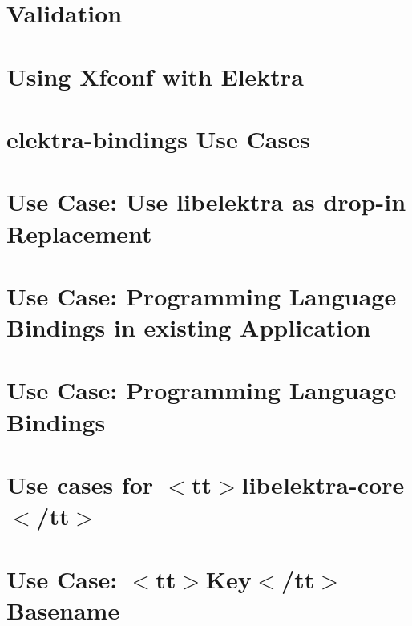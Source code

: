 \let\mypdfximage\pdfximage\def\pdfximage{\immediate\mypdfximage}\documentclass[twoside]{book}
\newcommand{\+}{\discretionary{\mbox{\scriptsize$\hookleftarrow$}}{}{}}
\begin{document}
\chapter{Validation}
\label{doc_tutorials_validation_md}

\chapter{Using Xfconf with Elektra}
\label{doc_tutorials_xfconf_md}

\chapter{elektra-\/bindings Use Cases}
\label{doc_usecases_bindings_README_md}

\chapter{Use Case\+: Use libelektra as drop-\/in Replacement}
\label{doc_usecases_bindings_UC_drop_in_application_md}

\chapter{Use Case\+: Programming Language Bindings in existing Application}
\label{doc_usecases_bindings_UC_existing_application_md}

\chapter{Use Case\+: Programming Language Bindings}
\label{doc_usecases_bindings_UC_new_application_md}

\chapter{Use cases for $<$tt$>$libelektra-\/core$<$/tt$>$}
\label{doc_usecases_core_README_md}

\chapter{Use Case\+: $<$tt$>$Key$<$/tt$>$ Basename}
\label{doc_usecases_core_UC_key_base_name_md}

\end{document}
